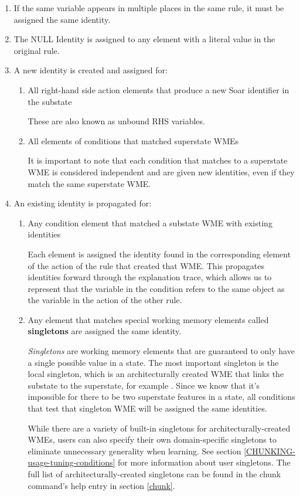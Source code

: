 \begin{enumerate}
	\item If the same variable appears in multiple places in the same rule, it must be assigned the same identity.

	\item The NULL Identity is assigned to any element with a literal value in the original rule.

	\item A new identity is created and assigned for:
	\begin{enumerate}
		\item All right-hand side action elements that produce a new Soar identifier in the substate
	
		These are also known as unbound RHS variables.

		\item All elements of conditions that matched superstate WMEs

		It is important to note that each condition that matches to a superstate WME is considered independent and are given new identities, even if they match the same superstate WME.
	\end{enumerate}
	\item An existing identity is propagated for:

	\begin{enumerate}
		\item Any condition element that matched a substate WME with existing identities

		Each element is assigned the identity found in the corresponding element of the action of the rule that created that WME.  This propagates identities forward through the explanation trace, which allows us to represent that the variable in the condition refers to the same object as the variable in the action of the other rule.

		\item Any element that matches special working memory elements called \textbf{singletons} are assigned the same identity.

		\label{CHUNKING-singletons1}
		\textit{Singletons} are working memory elements that are guaranteed to only have a single possible value in a state.  The most important singleton is the local  singleton, which is an architecturally created WME that links the substate to the superstate, for example .  Since we know that it's impossible for there to be two superstate features in a state, all conditions that test that singleton WME will be assigned the same identities.

		While there are a variety of built-in singletons for architecturally-created WMEs, users can also specify their own domain-specific singletons to eliminate unnecessary generality when learning.  See section \ref{CHUNKING-usage-tuning-conditions} for more information about user singletons.  The full list of architecturally-created singletons can be found in the chunk command's help entry in section \ref{chunk}.
	\end{enumerate}
\end{enumerate}

